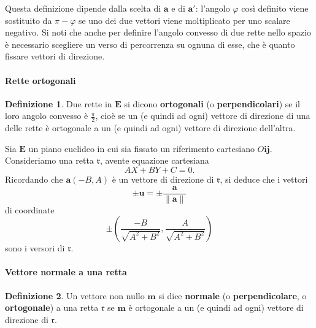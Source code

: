 \documentclass{article}
\theoremstyle{plain}
\theoremstyle{definition}
\newtheorem{defn}{Definizione}[section]
\theoremstyle{remark}
\begin{document}
\vspace{10pt}

Questa definizione dipende dalla scelta di $\mathbf{a}$ e di $\mathbf{a}'$: l'angolo $\varphi$ così definito viene sostituito da 
$\pi - \varphi$ se uno dei due vettori viene moltiplicato per uno scalare negativo. Si noti che anche per definire l'angolo 
convesso di due rette nello spazio è necessario scegliere un verso di percorrenza su ognuna di esse, che è quanto fissare vettori 
di direzione.

\vspace{10pt}

\paragraph{Rette ortogonali}
\begin{bxthm}
\begin{defn}
Due rette in $\mathbf{E}$ si dicono \textbf{ortogonali} (o \textbf{perpendicolari}) se il loro angolo convesso è $\frac{\pi}{2}$, cioè se un 
(e quindi ad ogni) vettore di direzione di una delle rette è ortogonale a un (e quindi ad ogni) vettore di direzione dell'altra.    
\end{defn}
\end{bxthm}

\vspace{10pt}

Sia $\mathbf{E}$ un piano euclideo in cui sia fissato un riferimento cartesiano $O\mathbf{i}\mathbf{j}$. 
Consideriamo una retta $\mathfrak{r}$, avente equazione cartesiana
\begin{equation}\label{diciannoveeuno}
AX + BY + C = 0.
\end{equation}
Ricordando che $\mathbf{a}(-B, A)$ è un vettore di direzione di $\mathfrak{r}$, si deduce che i vettori
\[\pm \mathbf{u} = \pm \frac{\mathbf{a}}{\|\mathbf{a}\|}\]
di coordinate
\[\pm \left( \frac{-B}{\sqrt{A^2 + B^2}}, \frac{A}{\sqrt{A^2 + B^2}} \right)\]
sono i versori di $\mathfrak{r}$.

\vspace{10pt}

\paragraph{Vettore normale a una retta}
\begin{bxthm}
\begin{defn}
    Un vettore non nullo $\mathbf{m}$ si dice \textbf{normale} (o \textbf{perpendicolare}, o \textbf{ortogonale}) a 
    una retta $\mathfrak{r}$ se $\mathbf{m}$ è ortogonale a un (e quindi ad ogni) vettore di direzione di $\mathfrak{r}$.
\end{defn}
\end{bxthm}
\end{document}

